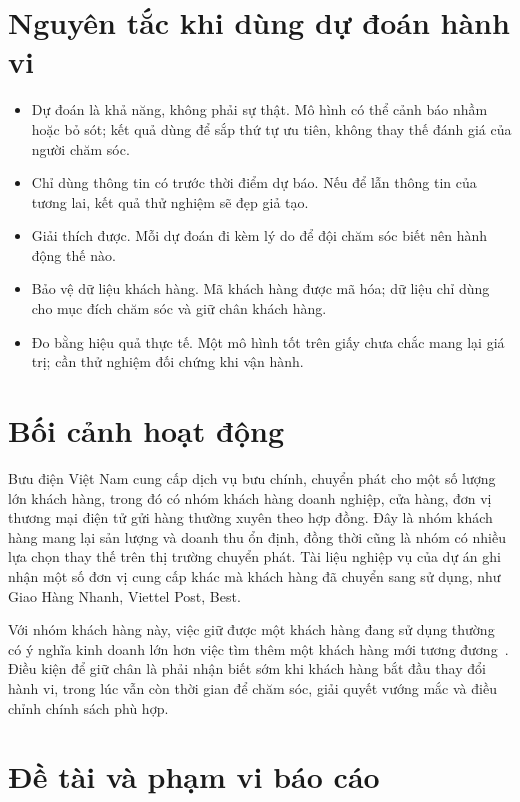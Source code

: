 \section{Nguyên tắc khi dùng dự đoán hành vi}

\begin{itemize}
  \item Dự đoán là khả năng, không phải sự thật. Mô hình có thể cảnh báo nhầm hoặc bỏ sót; kết quả dùng để sắp thứ tự ưu tiên, không thay thế đánh giá của người chăm sóc.
  \item Chỉ dùng thông tin có trước thời điểm dự báo. Nếu để lẫn thông tin của tương lai, kết quả thử nghiệm sẽ đẹp giả tạo.
  \item Giải thích được. Mỗi dự đoán đi kèm lý do để đội chăm sóc biết nên hành động thế nào.
  \item Bảo vệ dữ liệu khách hàng. Mã khách hàng được mã hóa; dữ liệu chỉ dùng cho mục đích chăm sóc và giữ chân khách hàng.
  \item Đo bằng hiệu quả thực tế. Một mô hình tốt trên giấy chưa chắc mang lại giá trị; cần thử nghiệm đối chứng khi vận hành.
\end{itemize}

\section{Bối cảnh hoạt động}

Bưu điện Việt Nam cung cấp dịch vụ bưu chính, chuyển phát cho một số lượng lớn khách hàng, trong đó có nhóm khách hàng
doanh nghiệp, cửa hàng, đơn vị thương mại điện tử gửi hàng thường xuyên theo hợp đồng. Đây là nhóm khách hàng mang lại sản lượng
và doanh thu ổn định, đồng thời cũng là nhóm có nhiều lựa chọn thay thế trên thị trường chuyển phát. Tài liệu nghiệp vụ của dự án
ghi nhận một số đơn vị cung cấp khác mà khách hàng đã chuyển sang sử dụng, như Giao Hàng Nhanh, Viettel Post, Best.

Với nhóm khách hàng này, việc giữ được một khách hàng đang sử dụng thường có ý nghĩa kinh doanh lớn hơn việc tìm thêm
một khách hàng mới tương đương~\cite{reichheld1990zero}. Điều kiện để giữ chân là phải nhận biết sớm khi khách hàng bắt đầu thay đổi hành vi,
trong lúc vẫn còn thời gian để chăm sóc, giải quyết vướng mắc và điều chỉnh chính sách phù hợp.

\section{Đề tài và phạm vi báo cáo}

